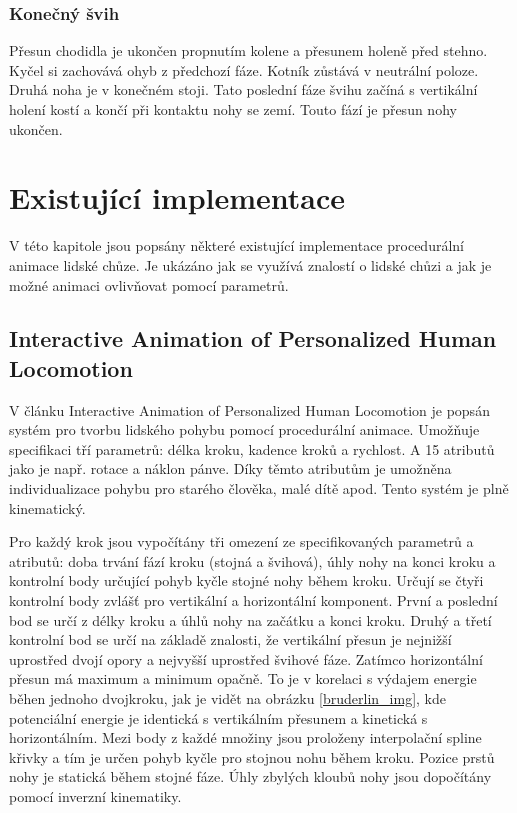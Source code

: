 \subsection{Konečný švih}
Přesun chodidla je ukončen propnutím kolene a přesunem holeně před stehno. Kyčel si zachovává ohyb z předchozí fáze. Kotník zůstává v neutrální poloze. Druhá noha je v konečném stoji. Tato poslední fáze švihu začíná s vertikální holení kostí a končí při kontaktu nohy se zemí. Touto fází je přesun nohy ukončen.

\chapter{Existující implementace}
V této kapitole jsou popsány některé existující implementace procedurální animace lidské chůze. Je ukázáno jak se využívá znalostí o lidské chůzi a jak je možné animaci ovlivňovat pomocí parametrů.
\section{Interactive Animation of Personalized Human Locomotion}
V článku Interactive Animation of Personalized Human Locomotion \cite{bruderlin} je popsán systém pro tvorbu lidského pohybu pomocí procedurální animace. Umožňuje specifikaci tří parametrů: délka kroku, kadence kroků a rychlost. A 15 atributů jako je např. rotace a náklon pánve. Díky těmto atributům je umožněna individualizace pohybu pro starého člověka, malé dítě apod. Tento systém je plně kinematický. 

Pro každý krok jsou vypočítány tři omezení ze specifikovaných parametrů a atributů: doba trvání fází kroku (stojná a švihová), úhly nohy na konci kroku a kontrolní body určující pohyb kyčle stojné nohy během kroku. Určují se čtyři kontrolní body zvlášť pro vertikální a horizontální komponent. První a  poslední bod se určí z délky kroku a úhlů nohy na začátku a konci kroku. Druhý a třetí kontrolní bod se určí na základě znalosti, že vertikální přesun je nejnižší uprostřed dvojí opory a nejvyšší uprostřed švihové fáze. Zatímco horizontální přesun má maximum a minimum opačně. To je v korelaci s výdajem energie běhen jednoho dvojkroku, jak je vidět na obrázku \ref{bruderlin_img}, kde potenciální energie je identická s vertikálním přesunem a kinetická s horizontálním. Mezi body z každé množiny jsou proloženy interpolační spline křivky a tím je určen pohyb kyčle pro stojnou nohu během kroku. Pozice prstů nohy je statická během stojné fáze. Úhly zbylých kloubů nohy jsou dopočítány pomocí inverzní kinematiky.

